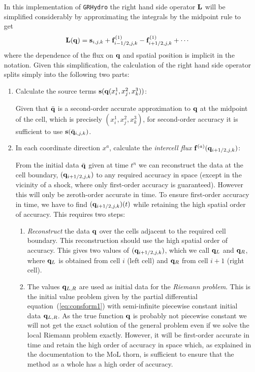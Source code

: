 \documentclass{article}
\begin{document}
In this implementation of {\tt GRHydro} the right hand side operator ${\bf L}$
will be simplified considerably by approximating the integrals by the
midpoint rule to get
\begin{equation}
  \label{eq:molrhs2}
  {\bf L}({\bf q}) = {\bf s}_{i,j,k} + {\bf f}^{(1)}_{i-1/2,j,k} -
    {\bf f}^{(1)}_{i+1/2,j,k} + \cdots
\end{equation}
where the dependence of the flux on ${\bf q}$ and spatial position is
implicit in the notation. Given this simplification, the calculation
of the right hand side operator splits simply into the following two parts:
\begin{enumerate}
\item Calculate the source terms ${\bf s}({\bf q}(x^1_i, x^2_j,
  x^3_k))$:

  Given that $\bar{{\bf q}}$ is a second-order accurate approximation
  to ${\bf q}$ at the midpoint of the cell, which is precisely $(x^1_i, x^2_j,
  x^3_k)$, for second-order accuracy it is sufficient to use ${\bf
  s}(\bar{{\bf q}}_{i,j,k})$.
\item In each coordinate direction $x^a$, calculate the {\it intercell
    flux} ${\bf f}^{(a)}({\bf q}_{i+1/2,j,k})$:
  
  From the initial data $\bar{{\bf q}}$ given at time $t^n$ we can
  reconstruct the data at the cell boundary, $({\bf q}_{i+1/2,j,k})$
  to any required accuracy in space (except in the vicinity of a
  shock, where only first-order accuracy is guaranteed).
  However this will only be zeroth-order accurate
  in time. To ensure first-order accuracy in time, we have to find
  $({\bf q}_{i+1/2,j,k})(t)$ while retaining the high spatial order
  of accuracy. This requires two steps:
  \begin{enumerate}
  \item {\it Reconstruct} the data ${\bf q}$ over the cells adjacent
    to the required cell boundary. This reconstruction should use the
    high spatial order of accuracy. This gives two values of
    $({\bf q}_{i+1/2,j,k})$, which we call ${\bf q}_L$ and ${\bf q}_R$,
    where ${\bf q}_L$ is obtained from cell $i$ (left cell) and ${\bf q}_R$
    from cell $i+1$ (right cell).
  \item The values ${\bf q}_{L,R}$ are used as initial data for the
    {\it Riemann problem}. This is the initial value problem given by
    the partial differential equation~(\ref{eq:consform1}) with
    semi-infinite piecewise constant initial data ${\bf q}_{L,R}$. As
    the true function ${\bf q}$ is probably not piecewise constant we
    will not get the exact solution of the general problem even if we
    solve the local Riemann problem exactly. However, it will be first-order 
    accurate in time and retain the high order of accuracy in
    space which, as explained in the documentation to the MoL thorn,
    is sufficient to ensure that the method as a whole has a high
    order of accuracy. 
  \end{enumerate}
\end{enumerate}
\end{document}
